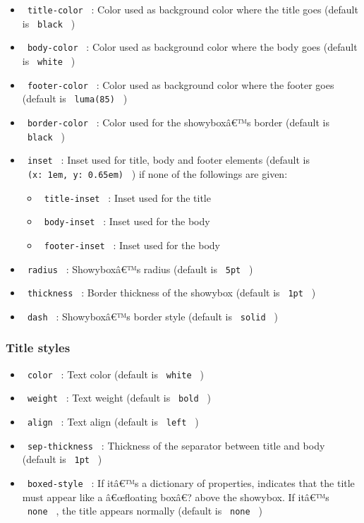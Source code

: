 \begin{itemize}
\tightlist
\item
  \texttt{\ title-color\ } : Color used as background color where the
  title goes (default is \texttt{\ black\ } )
\item
  \texttt{\ body-color\ } : Color used as background color where the
  body goes (default is \texttt{\ white\ } )
\item
  \texttt{\ footer-color\ } : Color used as background color where the
  footer goes (default is \texttt{\ luma(85)\ } )
\item
  \texttt{\ border-color\ } : Color used for the showyboxâ€™s border
  (default is \texttt{\ black\ } )
\item
  \texttt{\ inset\ } : Inset used for title, body and footer elements
  (default is \texttt{\ (x:\ 1em,\ y:\ 0.65em)\ } ) if none of the
  followings are given:

  \begin{itemize}
  \tightlist
  \item
    \texttt{\ title-inset\ } : Inset used for the title
  \item
    \texttt{\ body-inset\ } : Inset used for the body
  \item
    \texttt{\ footer-inset\ } : Inset used for the body
  \end{itemize}
\item
  \texttt{\ radius\ } : Showyboxâ€™s radius (default is \texttt{\ 5pt\ }
  )
\item
  \texttt{\ thickness\ } : Border thickness of the showybox (default is
  \texttt{\ 1pt\ } )
\item
  \texttt{\ dash\ } : Showyboxâ€™s border style (default is
  \texttt{\ solid\ } )
\end{itemize}

\subsubsection{Title styles}\label{title-styles}

\begin{itemize}
\tightlist
\item
  \texttt{\ color\ } : Text color (default is \texttt{\ white\ } )
\item
  \texttt{\ weight\ } : Text weight (default is \texttt{\ bold\ } )
\item
  \texttt{\ align\ } : Text align (default is \texttt{\ left\ } )
\item
  \texttt{\ sep-thickness\ } : Thickness of the separator between title
  and body (default is \texttt{\ 1pt\ } )
\item
  \texttt{\ boxed-style\ } : If itâ€™s a dictionary of properties,
  indicates that the title must appear like a â€œfloating boxâ€? above
  the showybox. If itâ€™s \texttt{\ none\ } , the title appears normally
  (default is \texttt{\ none\ } )
\end{itemize}

